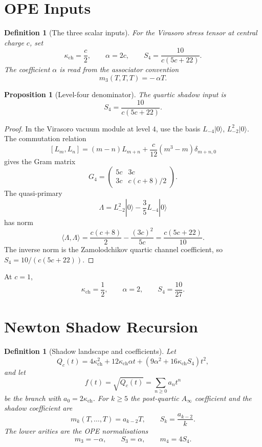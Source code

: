 \documentclass[11pt]{article}
\newtheorem{proposition}[theorem]{Proposition}
\newtheorem{definition}[theorem]{Definition}
\begin{document}
\section{OPE Inputs}

\begin{definition}[The three scalar inputs]
\label{def:three-inputs}
For the Virasoro stress tensor at central charge $c$, set
\[
  \kappa_{\mathrm{ch}}=\frac c2,\qquad
  \alpha=2c,\qquad
  S_4=\frac{10}{c(5c+22)}.
\]
The coefficient $\alpha$ is read from the associator convention
\[
  m_3(T,T,T)=-\,\alpha T.
\]
\end{definition}

\begin{proposition}[Level-four denominator]
\label{prop:level-four-denominator}
The quartic shadow input is
\[
  S_4=\frac{10}{c(5c+22)}.
\]
\end{proposition}

\begin{proof}
In the Virasoro vacuum module at level $4$, use the basis
$L_{-4}|0\rangle$, $L_{-2}^2|0\rangle$. The commutation relation
\[
  [L_m,L_n]=(m-n)L_{m+n}+\frac{c}{12}(m^3-m)\delta_{m+n,0}
\]
gives the Gram matrix
\[
  G_4=
  \begin{pmatrix}
    5c & 3c\\
    3c & c(c+8)/2
  \end{pmatrix}.
\]
The quasi-primary
\[
  \Lambda=L_{-2}^2|0\rangle-\frac35 L_{-4}|0\rangle
\]
has norm
\[
  \langle\Lambda,\Lambda\rangle
  =\frac{c(c+8)}2-\frac{(3c)^2}{5c}
  =\frac{c(5c+22)}{10}.
\]
The inverse norm is the Zamolodchikov quartic channel coefficient, so
$S_4=10/(c(5c+22))$.
\end{proof}

At $c=1$,
\[
  \kappa_{\mathrm{ch}}=\frac12,\qquad
  \alpha=2,\qquad
  S_4=\frac{10}{27}.
\]

\section{Newton Shadow Recursion}

\begin{definition}[Shadow landscape and coefficients]
\label{def:shadow-landscape}
Let
\[
  Q_c(t)
  =
  4\kappa_{\mathrm{ch}}^2
  +12\kappa_{\mathrm{ch}}\alpha t
  +(9\alpha^2+16\kappa_{\mathrm{ch}}S_4)t^2,
\]
and let
\[
  f(t)=\sqrt{Q_c(t)}=\sum_{n\geq0}a_nt^n
\]
be the branch with $a_0=2\kappa_{\mathrm{ch}}$. For $k\geq5$ the
post-quartic $A_\infty$ coefficient and the shadow coefficient are
\[
  m_k(T,\ldots,T)=a_{k-2}T,\qquad
  S_k=\frac{a_{k-2}}{k}.
\]
The lower arities are the OPE normalisations
\[
  m_3=-\alpha,\qquad S_3=\alpha,\qquad m_4=4S_4.
\]
\end{definition}
\end{document}
